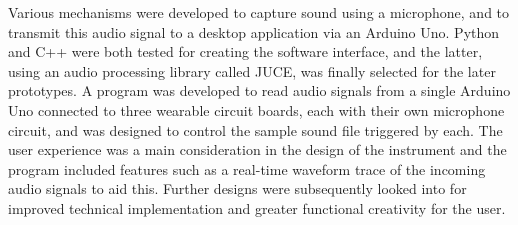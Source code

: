 Various mechanisms were developed to capture sound using a microphone, and to transmit this audio signal to a desktop application via an Arduino Uno. Python and C++ were both tested for creating the software interface, and the latter, using an audio processing library called JUCE, was finally selected for the later prototypes. A program was developed to read audio signals from a single Arduino Uno connected to three wearable circuit boards, each with their own microphone circuit, and was designed to control the sample sound file triggered by each. The user experience was a main consideration in the design of the instrument and the program included features such as a real-time waveform trace of the incoming audio signals to aid this. Further designs were subsequently looked into for improved technical implementation and greater functional creativity for the user.

\normalsize
\newpage